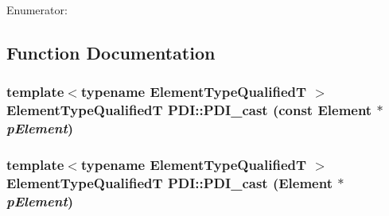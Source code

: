 \begin{Desc}
\item[Enumerator: ]\par
\begin{description}
\item[{\em 
\hypertarget{namespace_p_d_i_bbd28c6f8905ff6834d6f84ba4363e5e57323103f5b47fbac48214db5cdc0622}{
ARRAY\_\-ELEMENT}
\label{namespace_p_d_i_bbd28c6f8905ff6834d6f84ba4363e5e57323103f5b47fbac48214db5cdc0622}
}]\item[{\em 
\hypertarget{namespace_p_d_i_bbd28c6f8905ff6834d6f84ba4363e5ee043b54cf14e7e99bce4c52d879b56d6}{
DISPLAY\_\-ELEMENT}
\label{namespace_p_d_i_bbd28c6f8905ff6834d6f84ba4363e5ee043b54cf14e7e99bce4c52d879b56d6}
}]\item[{\em 
\hypertarget{namespace_p_d_i_bbd28c6f8905ff6834d6f84ba4363e5eb6c09510d6ad7929f8849b4871955c47}{
NULL\_\-ELEMENT}
\label{namespace_p_d_i_bbd28c6f8905ff6834d6f84ba4363e5eb6c09510d6ad7929f8849b4871955c47}
}]\end{description}
\end{Desc}



\subsection{Function Documentation}
\hypertarget{namespace_p_d_i_9940546f948318c316306e3145ed765b}{
\subsubsection[{PDI\_\-cast}]{\setlength{\rightskip}{0pt plus 5cm}template$<$typename ElementTypeQualifiedT $>$ ElementTypeQualifiedT PDI::PDI\_\-cast (const Element $\ast$ {\em pElement})}}
\label{namespace_p_d_i_9940546f948318c316306e3145ed765b}


\hypertarget{namespace_p_d_i_9995a6cf01ffe58f1d6159947a41d0aa}{
\subsubsection[{PDI\_\-cast}]{\setlength{\rightskip}{0pt plus 5cm}template$<$typename ElementTypeQualifiedT $>$ ElementTypeQualifiedT PDI::PDI\_\-cast (Element $\ast$ {\em pElement})}}
\label{namespace_p_d_i_9995a6cf01ffe58f1d6159947a41d0aa}


